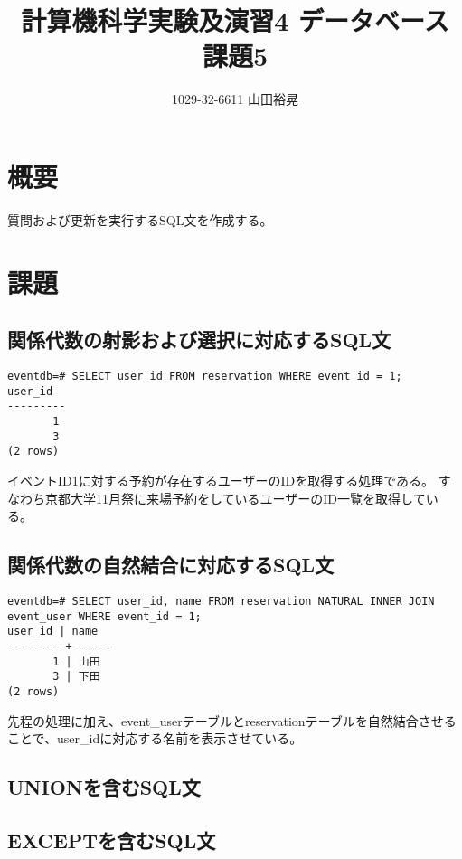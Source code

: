 \documentclass[dvipdfmx]{jarticle}
\begin{document}
\title{計算機科学実験及演習4 データベース 課題5}
\author{1029-32-6611 山田裕晃}
\maketitle

\section{概要}
質問および更新を実行するSQL文を作成する。

\section{課題}
\subsection{関係代数の射影および選択に対応するSQL文}
\begin{lstlisting}
eventdb=# SELECT user_id FROM reservation WHERE event_id = 1;
user_id
---------
       1
       3
(2 rows)
\end{lstlisting}
イベントID1に対する予約が存在するユーザーのIDを取得する処理である。
すなわち京都大学11月祭に来場予約をしているユーザーのID一覧を取得している。

\subsection{関係代数の自然結合に対応するSQL文}
\begin{lstlisting}
eventdb=# SELECT user_id, name FROM reservation NATURAL INNER JOIN event_user WHERE event_id = 1;
user_id | name
---------+------
       1 | 山田
       3 | 下田
(2 rows)
\end{lstlisting}
先程の処理に加え、event\_userテーブルとreservationテーブルを自然結合させることで、user\_idに対応する名前を表示させている。

\subsection{UNIONを含むSQL文}


\subsection{EXCEPTを含むSQL文}
\end{document}
